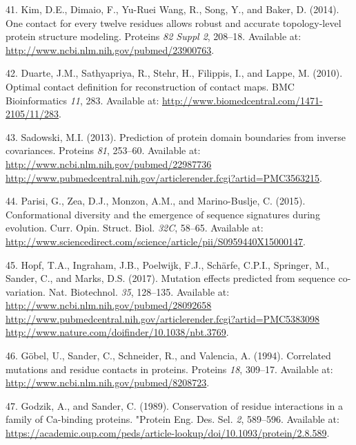 \documentclass[11pt,a4paper,twoside]{book}
\theoremstyle{definition}
\theoremstyle{definition}
\theoremstyle{remark}
\begin{document}
\hypertarget{ref-Kim2014}{}
41. Kim, D.E., Dimaio, F., Yu-Ruei Wang, R., Song, Y., and Baker, D.
(2014). One contact for every twelve residues allows robust and accurate
topology-level protein structure modeling. Proteins \emph{82 Suppl 2},
208--18. Available at:
\url{http://www.ncbi.nlm.nih.gov/pubmed/23900763}.

\hypertarget{ref-Duarte2010}{}
42. Duarte, J.M., Sathyapriya, R., Stehr, H., Filippis, I., and Lappe,
M. (2010). Optimal contact definition for reconstruction of contact
maps. BMC Bioinformatics \emph{11}, 283. Available at:
\url{http://www.biomedcentral.com/1471-2105/11/283}.

\hypertarget{ref-Sadowski2013}{}
43. Sadowski, M.I. (2013). Prediction of protein domain boundaries from
inverse covariances. Proteins \emph{81}, 253--60. Available at:
\href{http://www.ncbi.nlm.nih.gov/pubmed/22987736\%20http://www.pubmedcentral.nih.gov/articlerender.fcgi?artid=PMC3563215}{http://www.ncbi.nlm.nih.gov/pubmed/22987736 http://www.pubmedcentral.nih.gov/articlerender.fcgi?artid=PMC3563215}.

\hypertarget{ref-Parisi2015a}{}
44. Parisi, G., Zea, D.J., Monzon, A.M., and Marino-Buslje, C. (2015).
Conformational diversity and the emergence of sequence signatures during
evolution. Curr. Opin. Struct. Biol. \emph{32C}, 58--65. Available at:
\url{http://www.sciencedirect.com/science/article/pii/S0959440X15000147}.

\hypertarget{ref-Hopf2017}{}
45. Hopf, T.A., Ingraham, J.B., Poelwijk, F.J., Schärfe, C.P.I.,
Springer, M., Sander, C., and Marks, D.S. (2017). Mutation effects
predicted from sequence co-variation. Nat. Biotechnol. \emph{35},
128--135. Available at:
\href{http://www.ncbi.nlm.nih.gov/pubmed/28092658\%20http://www.pubmedcentral.nih.gov/articlerender.fcgi?artid=PMC5383098\%20http://www.nature.com/doifinder/10.1038/nbt.3769}{http://www.ncbi.nlm.nih.gov/pubmed/28092658 http://www.pubmedcentral.nih.gov/articlerender.fcgi?artid=PMC5383098 http://www.nature.com/doifinder/10.1038/nbt.3769}.

\hypertarget{ref-Gobel1994}{}
46. Göbel, U., Sander, C., Schneider, R., and Valencia, A. (1994).
Correlated mutations and residue contacts in proteins. Proteins
\emph{18}, 309--17. Available at:
\url{http://www.ncbi.nlm.nih.gov/pubmed/8208723}.

\hypertarget{ref-Godzik1989}{}
47. Godzik, A., and Sander, C. (1989). Conservation of residue
interactions in a family of Ca-binding proteins. "Protein Eng. Des. Sel.
\emph{2}, 589--596. Available at:
\url{https://academic.oup.com/peds/article-lookup/doi/10.1093/protein/2.8.589}.
\end{document}
